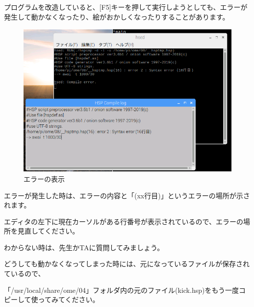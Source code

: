 \begin{description}
    \item {}
\end{description}

プログラムを改造していると、[F5]キーを押して実行しようとしても、エラーが発生して動かなくなったり、絵がおかしくなったりすることがあります。


\begin{figure}[H]
    \begin{center}
      \includegraphics[keepaspectratio,width=11.324cm,height=7.756cm]{text04-img/text04-img011.png}
      \caption{エラーの表示}
    \end{center}
    \label{fig:prog_menu}
\end{figure}

エラーが発生した時は、エラーの内容と「(xx行目)」というエラーの場所が示されます。

エディタの左下に現在カーソルがある行番号が表示されているので、エラーの場所を見直してください。

わからない時は、先生かTAに質問してみましょう。

どうしても動かなくなってしまった時には、元になっているファイルが保存されているので、

「/usr/local/share/ome/04」フォルダ内の元のファイル(kick.hsp)をもう一度コピーして使ってみてください。